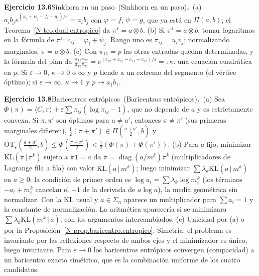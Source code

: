 \documentclass[11pt,a4paper]{amsart}
\newcommand{\ve}{\varepsilon}
\theoremstyle{remark}
\theoremstyle{definition}
\numberwithin{subsection}{section}
\numberwithin{equation}{section}
\newcommand{\ejlabel}[2]{\par\medskip\noindent\textbf{Ejercicio #1}\ifx\relax#2\relax\else\ (#2)\fi\textbf{.}\ }
\begin{document}
\ejlabel{13.6}{Sinkhorn en un paso}(a) $a_ib_je^{(\varphi_i+\psi_j-f_i-g_j)/\ve}=a_ib_j$ con $\varphi=f$, $\psi=g$, que ya está en $\Pi(a,b)$; el Teorema~\ref{N-teo.dual.entropico} da $\pi^\ve=a\otimes b$. (b) Si $\pi^\ve=a\otimes b$, tomar logaritmos en la fórmula de $\pi^\ve$: $c_{ij}=\varphi_i+\psi_j$. Rango uno es $\pi_{ij}=u_iv_j$; normalizando marginales, $\pi=a\otimes b$. (c) Con $\pi_{11}=p$ las otras entradas quedan determinadas, y la fórmula del plan da $\frac{\pi_{11}\pi_{22}}{\pi_{12}\pi_{21}}=e^{(c_{12}+c_{21}-c_{11}-c_{22})/\ve}=:\kappa$: una ecuación cuadrática en $p$. Si $\ve\to0$, $\kappa\to0$ o $\infty$ y $p$ tiende a un extremo del segmento (el vértice óptimo); si $\ve\to\infty$, $\kappa\to1$ y $p\to a_1b_1$.

\ejlabel{13.8}{Baricentros entrópicos}(a) Sea $\Phi(\pi)=\langle C,\pi\rangle+\ve\sum\pi_{ij}(\log\pi_{ij}-1)$, que no depende de $a$ y es estrictamente convexa. Si $\pi,\pi'$ son óptimos para $a\ne a'$, entonces $\pi\ne\pi'$ (sus primeras marginales difieren), $\frac12(\pi+\pi')\in\Pi(\frac{a+a'}2,b)$ y $\widetilde{\mathrm{OT}}_\ve(\frac{a+a'}2,b)\le\Phi(\frac{\pi+\pi'}2)<\frac12(\Phi(\pi)+\Phi(\pi'))$. (b) Para $a$ fijo, minimizar $\widetilde{\mathrm{KL}}(\tilde\pi\,|\,\pi^k)$ sujeto a $\tilde\pi\mathbf 1=a$ da $\tilde\pi=\operatorname{diag}(a/m^k)\pi^k$ (multiplicadores de Lagrange fila a fila) con valor $\widetilde{\mathrm{KL}}(a\,|\,m^k)$; luego minimizar $\sum\lambda_k\widetilde{\mathrm{KL}}(a\,|\,m^k)$ en $a\ge0$: la condición de primer orden es $\log a_i=\sum\lambda_k\log m^k_i$ (los términos $-a_i+m^k_i$ cancelan el $+1$ de la derivada de $a\log a$), la media geométrica sin normalizar. Con la $\mathrm{KL}$ usual y $a\in\Sigma_n$ aparece un multiplicador para $\sum a_i=1$ y la constante de normalización. La aritmética aparecería si se minimizara $\sum\lambda_k\mathrm{KL}(m^k\,|\,a)$, con los argumentos intercambiados. (c) Unicidad por (a) o por la Proposición~\ref{N-prop.baricentro.entropico}. Simetría: el problema es invariante por las reflexiones respecto de ambos ejes y el minimizador es único, luego invariante. Para $\ve\to0$ los baricentros entrópicos convergen (compacidad) a un baricentro exacto simétrico, que es la combinación uniforme de los cuatro candidatos.
\end{document}
